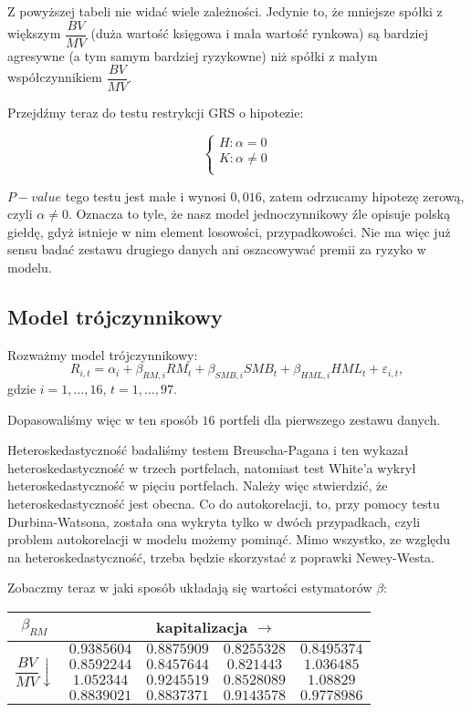 \documentclass[11pt,a4paper]{report}
\begin{document}
Z powyższej tabeli nie widać wiele zależności. Jedynie to, że mniejsze spółki z większym $\dfrac{BV}{MV}$ (duża wartość księgowa i mała wartość rynkowa) są bardziej agresywne (a tym samym bardziej ryzykowne) niż spółki z małym współczynnikiem $\dfrac{BV}{MV}$. 

\bigskip

Przejdźmy teraz do testu restrykcji GRS o hipotezie:

$$
\left\{
\begin{array}{l}
H: \alpha = 0 \\
K: \alpha \neq 0\\
\end{array}
\right.
$$

$P-value$ tego testu jest małe i wynosi $0,016$, zatem odrzucamy hipotezę zerową, czyli $\alpha \neq 0$. Oznacza to tyle, że nasz model jednoczynnikowy źle opisuje polską giełdę, gdyż istnieje w nim element losowości, przypadkowości. Nie ma więc już sensu badać zestawu drugiego danych ani oszacowywać premii za ryzyko w modelu.


\subsection*{Model trójczynnikowy}

Rozważmy model trójczynnikowy:
$$
R_{i,t}=\alpha_i + \beta_{RM,i}RM_t+ \beta_{SMB,i}SMB_t+ \beta_{HML,i}HML_t+ \varepsilon_{i,t},
$$
gdzie $i=1,\ldots,16$, $t=1,\ldots,97$.

Dopasowaliśmy więc w ten sposób $16$ portfeli dla pierwszego zestawu danych.

Heteroskedastyczność badaliśmy testem Breuscha-Pagana i ten wykazał heteroskedastyczność w trzech portfelach, natomiast test White'a wykrył heteroskedastyczność w pięciu portfelach. Należy więc stwierdzić, że heteroskedastyczność jest obecna. Co do autokorelacji, to, przy pomocy testu Durbina-Watsona, została ona wykryta tylko w dwóch przypadkach, czyli problem autokorelacji w modelu możemy pominąć. Mimo wszystko, ze względu na heteroskedastyczność, trzeba będzie skorzystać z poprawki Newey-Westa.  

Zobaczmy teraz w jaki sposób układają się wartości estymatorów $\beta$:

\bigskip

\begin{center}
\begin{tabular}{|c|c|c|c|c|}
\hline
$\beta_{RM}$ & \multicolumn{4}{|c|}{kapitalizacja $\longrightarrow$}  \\ \hline 
\multirow{4}{*}{$\dfrac{BV}{MV} \downarrow$} &  $ 0.9385604 $ & $ 0.8875909 $ & $ 0.8255328 $ & $ 0.8495374 $ \\ \cline{2-5}
 & $ 0.8592244 $ & $ 0.8457644 $ & $ 0.821443 $ & $ 1.036485 $ \\ \cline{2-5}
 & $ 1.052344 $ & $ 0.9245519 $ & $ 0.8528089 $ & $ 1.08829 $ \\ \cline{2-5}
 & $ 0.8839021 $ & $ 0.8837371 $ & $ 0.9143578 $ & $ 0.9778986 $ \\ \hline
\end{tabular}
\end{center}
\end{document}
